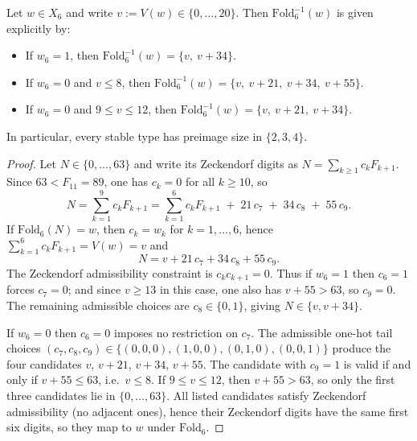 \begin{lemma}\label{lem:fold6_fiber_explicit}
Let $w\in X_6$ and write $v:=V(w)\in\{0,\dots,20\}$.
Then $\mathrm{Fold}_6^{-1}(w)$ is given explicitly by:
\begin{itemize}
\item If $w_6=1$, then $\mathrm{Fold}_6^{-1}(w)=\{v,\ v+34\}$.
\item If $w_6=0$ and $v\le 8$, then $\mathrm{Fold}_6^{-1}(w)=\{v,\ v+21,\ v+34,\ v+55\}$.
\item If $w_6=0$ and $9\le v\le 12$, then $\mathrm{Fold}_6^{-1}(w)=\{v,\ v+21,\ v+34\}$.
\end{itemize}
In particular, every stable type has preimage size in $\{2,3,4\}$.
\end{lemma}
\begin{proof}
Let $N\in\{0,\dots,63\}$ and write its Zeckendorf digits as $N=\sum_{k\ge 1} c_k F_{k+1}$.
Since $63<F_{11}=89$, one has $c_k=0$ for all $k\ge 10$, so
\[
N=\sum_{k=1}^{9} c_k F_{k+1}
=\sum_{k=1}^{6} c_k F_{k+1} \;+\; 21\,c_7 \;+\; 34\,c_8 \;+\; 55\,c_9.
\]
If $\mathrm{Fold}_6(N)=w$, then $c_k=w_k$ for $k=1,\dots,6$, hence $\sum_{k=1}^{6} c_k F_{k+1}=V(w)=v$ and
\[
N=v+21\,c_7+34\,c_8+55\,c_9.
\]
The Zeckendorf admissibility constraint is $c_kc_{k+1}=0$.
Thus if $w_6=1$ then $c_6=1$ forces $c_7=0$; and since $v\ge 13$ in this case, one also has $v+55>63$, so $c_9=0$.
The remaining admissible choices are $c_8\in\{0,1\}$, giving $N\in\{v,v+34\}$.

If $w_6=0$ then $c_6=0$ imposes no restriction on $c_7$.
The admissible one-hot tail choices $(c_7,c_8,c_9)\in\{(0,0,0),(1,0,0),(0,1,0),(0,0,1)\}$ produce the four candidates $v$, $v+21$, $v+34$, $v+55$.
The candidate with $c_9=1$ is valid if and only if $v+55\le 63$, i.e.\ $v\le 8$.
If $9\le v\le 12$, then $v+55>63$, so only the first three candidates lie in $\{0,\dots,63\}$.
All listed candidates satisfy Zeckendorf admissibility (no adjacent ones), hence their Zeckendorf digits have the same first six digits, so they map to $w$ under $\mathrm{Fold}_6$.
\end{proof}

